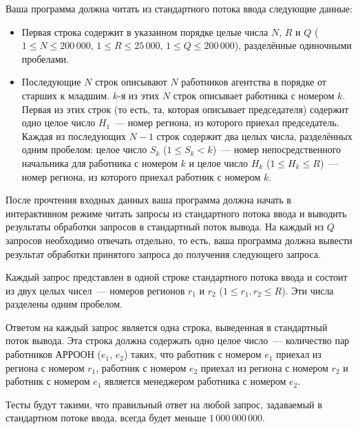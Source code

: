 Ваша программа должна читать из стандартного потока ввода следующие данные:
\begin{itemize}
\item Первая строка содержит в указанном порядке целые числа $N$, $R$ и $Q$ ($1 \le N \le 200\,000$, $1 \le R \le 25\,000$, $1 \le Q \le 200\,000$), разделённые одиночными
пробелами.
\item Последующие $N$ строк описывают $N$ работников агентства в порядке от старших к младшим. $k$-я из этих $N$ строк описывает работника с номером $k$. Первая из этих строк (то есть, та, которая описывает председателя) содержит одно целое число $H_1$~--- номер региона, из которого приехал председатель. Каждая из последующих $N-1$ строк содержит два целых числа, разделённых одним пробелом: целое число $S_k$ ($1\le S_k < k$)~--- номер непосредственного начальника для работника с номером $k$ и целое число $H_k$ ($1 \le H_k \le R$)~--- номер региона, из которого приехал работник с номером $k$.
\end{itemize}

После прочтения входных данных ваша программа должна начать в интерактивном режиме читать запросы из стандартного потока ввода и выводить результаты обработки запросов в стандартный поток вывода. На каждый из $Q$ запросов необходимо отвечать отдельно, то есть, ваша программа должна вывести результат обработки принятого запроса до получения следующего запроса.

Каждый запрос представлен в одной строке стандартного потока ввода и состоит из двух целых чисел~--- номеров регионов $r_1$ и $r_2$ ($1 \le r_1, r_2 \le R$). Эти числа разделены одним пробелом.

Ответом на каждый запрос является одна строка, выведенная в стандартный поток вывода. Эта строка должна содержать одно целое число~--- количество пар работников АРРООН ($e_1$, $e_2$) таких, что работник с номером $e_1$ приехал из региона с номером $r_1$, работник с номером $e_2$ приехал из региона с номером $r_2$ и работник с номером $e_1$ является менеджером работника с номером $e_2$.

Тесты будут такими, что правильный ответ на любой запрос, задаваемый в стандартном
потоке ввода, всегда будет меньше $1\,000\,000\,000$.